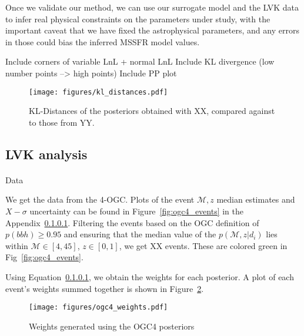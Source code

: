 \documentclass[twocolumn]{aastex631}
\newcommand{\Mc}{\ensuremath{\mathcal{M}}\xspace}
\newcommand{\project}[1]{\textsf{#1}}
\newcommand{\ogc}{\project{4-OGC}}
\begin{document}
Once we validate our method, we can use our surrogate model and the LVK data to infer real physical constraints on the parameters under study, with the important caveat that we have fixed the astrophysical parameters, and any errors in those could bias the inferred \ac{MSSFR} model values.

Include corners of variable LnL + normal LnL
Include KL divergence (low number points --> high points)
Include PP plot





\begin{figure}[ht!]
    \begin{centering}
        \texttt{[image: figures/kl\_distances.pdf]}
        \caption{
            KL-Distances of the posteriors obtained with XX, compared against to those from YY.
        }
        \label{fig:kl_distances}
    \end{centering}
\end{figure}




\subsection{LVK analysis}
\paragraph{}{Data}

We get the data from the \ogc.
Plots of the event $\Mc,z$ median estimates and $X-\sigma$ uncertainty can be found in Figure~\ref{fig:ogc4_events} in the Appendix~\ref{}. 
Filtering the events based on the OGC definition of $p(bbh)\geq0.95$ and ensuring that the median value of the $p(\Mc,z|d_i)$ lies within $\Mc\in[4,45]$, $z\in[0,1]$, we get XX events. 
These are colored green in Fig~\ref{fig:ogc4_events}.

Using Equation~\ref{}, we obtain the weights for each posterior. 
A plot of each event's weights summed together is shown in Figure~\ref{fig:ogc4_weights}.




\begin{figure}[ht!]
    \begin{centering}
        \texttt{[image: figures/ogc4\_weights.pdf]}
        \caption{
            Weights generated using the OGC4 posteriors
        }
        \label{fig:ogc4_weights}
    \end{centering}
\end{figure}
\end{document}
